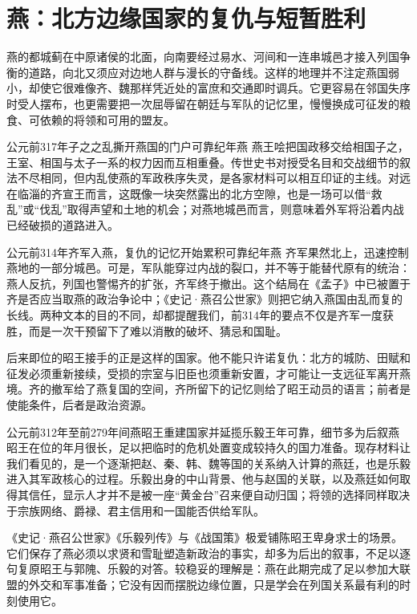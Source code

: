 \section{燕：北方边缘国家的复仇与短暂胜利}

燕的都城蓟在中原诸侯的北面，向南要经过易水、河间和一连串城邑才接入列国争衡的道路，向北又须应对边地人群与漫长的守备线。这样的地理并不注定燕国弱小，却使它很难像齐、魏那样凭近处的富庶和交通即时调兵。它更容易在邻国失序时受人摆布，也更需要把一次屈辱留在朝廷与军队的记忆里，慢慢换成可征发的粮食、可依赖的将领和可用的盟友。

\begin{event}{公元前317年}{子之之乱撕开燕国的门户}{可靠纪年}{燕}
燕王哙把国政移交给相国子之，王室、相国与太子一系的权力因而互相重叠。传世史书对授受名目和交战细节的叙法不尽相同，但内乱使燕的军政秩序失灵，是各家材料可以相互印证的主线。对远在临淄的齐宣王而言，这既像一块突然露出的北方空隙，也是一场可以借“救乱”或“伐乱”取得声望和土地的机会；对燕地城邑而言，则意味着外军将沿着内战已经破损的道路进入。
\end{event}

\begin{event}{公元前314年}{齐军入燕，复仇的记忆开始累积}{可靠纪年}{燕}
齐军果然北上，迅速控制燕地的一部分城邑。可是，军队能穿过内战的裂口，并不等于能替代原有的统治：燕人反抗，列国也警惕齐的扩张，齐军终于撤出。这个结局在《孟子》中已被置于齐是否应当取燕的政治争论中；《史记·燕召公世家》则把它纳入燕国由乱而复的长线。两种文本的目的不同，却都提醒我们，前314年的要点不仅是齐军一度获胜，而是一次干预留下了难以消散的破坏、猜忌和国耻。

后来即位的昭王接手的正是这样的国家。他不能只许诺复仇：北方的城防、田赋和征发必须重新接续，受损的宗室与旧臣也须重新安置，才可能让一支远征军离开燕境。齐的撤军给了燕复国的空间，齐所留下的记忆则给了昭王动员的语言；前者是使能条件，后者是政治资源。
\end{event}

\begin{event}{公元前312年至前279年间}{燕昭王重建国家并延揽乐毅}{王年可靠，细节多为后叙}{燕}
昭王在位的年月很长，足以把临时的危机处置变成较持久的国力准备。现存材料让我们看见的，是一个逐渐把赵、秦、韩、魏等国的关系纳入计算的燕廷，也是乐毅进入其军政核心的过程。乐毅出身的中山背景、他与赵国的关联，以及燕廷如何取得其信任，显示人才并不是被一座“黄金台”召来便自动归国；将领的选择同样取决于宗族网络、爵禄、君主信用和一国能否供给军队。

《史记·燕召公世家》《乐毅列传》与《战国策》极爱铺陈昭王卑身求士的场景。它们保存了燕必须以求贤和雪耻塑造新政治的事实，却多为后出的叙事，不足以逐句复原昭王与郭隗、乐毅的对答。较稳妥的理解是：燕在此期完成了足以参加大联盟的外交和军事准备；它没有因而摆脱边缘位置，只是学会在列国关系最有利的时刻使用它。
\end{event}

